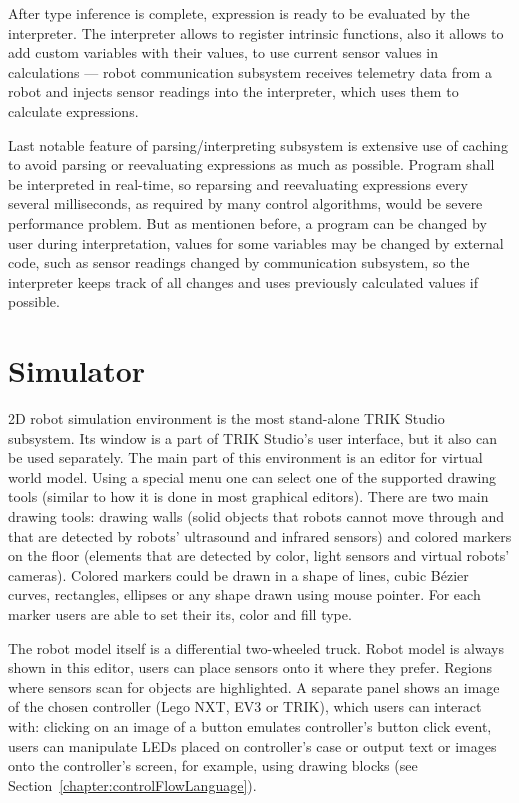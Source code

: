 \documentclass[conference]{IEEEtran}
\begin{document}
After type inference is complete, expression is ready to be evaluated by the interpreter. The interpreter allows to register intrinsic functions, also it allows to add custom variables with their values, to use current sensor values in calculations --- robot communication subsystem receives telemetry data from a robot and injects sensor readings into the interpreter, which uses them to calculate expressions.

Last notable feature of parsing/interpreting subsystem is extensive use of caching to avoid parsing or reevaluating expressions as much as possible. Program shall be interpreted in real-time, so reparsing and reevaluating expressions every several milliseconds, as required by many control algorithms, would be severe performance problem. But as mentionen before, a program can be changed by user during interpretation, values for some variables may be changed by external code, such as sensor readings changed by communication subsystem, so the interpreter keeps track of all changes and uses previously calculated values if possible.

\section{Simulator}
\label{chapter:2dModel}

2D robot simulation environment is the most stand-alone TRIK Studio subsystem. Its window is a part of TRIK Studio's user interface, but it also can be used separately. The main part of this environment is an editor for virtual world model. Using a special menu one can select one of the supported drawing tools (similar to how it is done in most graphical editors). There are two main drawing tools: drawing walls (solid objects that robots cannot move through and that are detected by robots' ultrasound and infrared sensors) and colored markers on the floor (elements that are detected by color, light sensors and virtual robots' cameras). Colored markers could be drawn in a shape of lines, cubic Bézier curves, rectangles, ellipses or any shape drawn using mouse pointer. For each marker users are able to set their its, color and fill type. 

The robot model itself is a differential two-wheeled truck. Robot model is always shown in this editor, users can place sensors onto it where they prefer. Regions where sensors scan for objects are highlighted. A separate panel shows an image of the chosen controller (Lego NXT, EV3 or TRIK), which users can interact with: clicking on an image of a button emulates controller's button click event, users can manipulate LEDs placed on controller's case or output text or images onto the controller's screen, for example,  using drawing blocks (see Section~\ref{chapter:controlFlowLanguage}).
\end{document}
